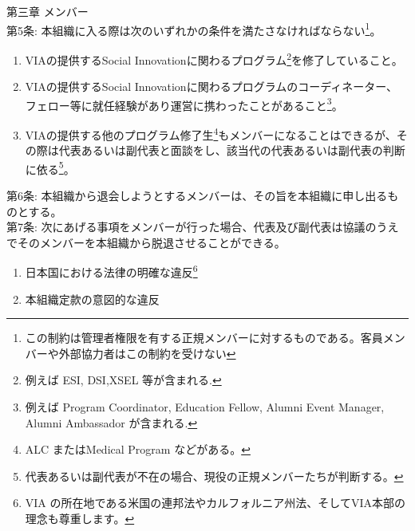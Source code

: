 \documentclass[dvipdfmx,11pt]{jsarticle}
\begin{document}
第三章 メンバー\\
第5条: 本組織に入る際は次のいずれかの条件を満たさなければならない\footnote{この制約は管理者権限を有する正規メンバーに対するものである。客員メンバーや外部協力者はこの制約を受けない}。
\begin{enumerate}
\item VIAの提供するSocial Innovationに関わるプログラム\footnote{例えば ESI, DSI,XSEL 等が含まれる.}を修了していること。
\item VIAの提供するSocial Innovationに関わるプログラムのコーディネーター、フェロー等に就任経験があり運営に携わったことがあること\footnote{例えば Program Coordinator, Education Fellow, Alumni Event Manager, Alumni Ambassador が含まれる.}。
\item VIAの提供する他のプログラム修了生\footnote{ALC またはMedical Program などがある。}もメンバーになることはできるが、その際は代表あるいは副代表と面談をし、該当代の代表あるいは副代表の判断に依る\footnote{代表あるいは副代表が不在の場合、現役の正規メンバーたちが判断する。}。
\end{enumerate}
第6条: 本組織から退会しようとするメンバーは、その旨を本組織に申し出るものとする。\\
第7条: 次にあげる事項をメンバーが行った場合、代表及び副代表は協議のうえでそのメンバーを本組織から脱退させることができる。
\begin{enumerate}
\item 日本国における法律の明確な違反\footnote{VIA の所在地である米国の連邦法やカルフォルニア州法、そしてVIA本部の理念も尊重します。}
\item 本組織定款の意図的な違反
\end{enumerate}
\end{document}
